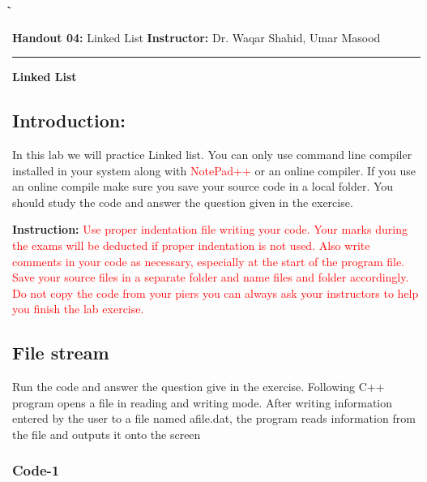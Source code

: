 \documentclass{article}
\newcommand{\red}[1]{\textcolor{red}{#1}}
\begin{document}
\begin{tabbing}
  \`\=\kill
  
  \textbf{Handout 04:} Linked List 
  \` \textbf{Instructor:} Dr. Waqar Shahid, Umar Masood
\end{tabbing}

\hrule

\vspace{.25in}

\begin{center}
\textbf{\Large Linked List}
\end{center}

\vspace{.15in}

\subsection*{Introduction:} 
\noindent In this lab we will practice Linked list. You can only use command line compiler installed in your system along with \red{NotePad++} or an online compiler. If  you use an online compile make sure you save your source code in a local folder. You should study the code and answer the question given in the exercise.

\medskip

\noindent \textbf{Instruction: }\red{ Use proper indentation file writing your code. Your marks during the exams will be deducted if proper indentation is not used. Also write comments in your code as necessary, especially at the start of the program file. Save your source files in a separate folder and name files and folder accordingly. Do not copy the code from your piers you can always ask your instructors to help you finish the lab exercise.}

\subsection*{File stream}
\noindent Run the code and answer the question give in the exercise. Following C++ program opens a file in reading and writing mode. After writing information entered by the user to a file named afile.dat, the program reads information from the file and outputs it onto the screen

\subsubsection*{Code-1}
\end{document}
